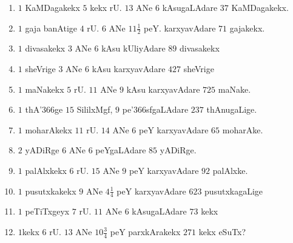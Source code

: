 \begin{enumerate}[\rm(1)]
\item $1$ KaMDagakekx $5$ kekx rU. $13$ ANe $6$ kAsugaLAdare $37$ KaMDagakekx.

\item $1$ gaja banAtige $4$ rU. $6$ ANe $11\frac{1}{2}$ peY. karxyavAdare $71$ gajakekx.

\item $1$ divasakekx $3$ ANe $6$ kAsu kUliyAdare $89$ divasakekx

\item $1$ sheVrige $3$ ANe $6$ kAsu karxyavAdare $427$ sheVrige
\item $1$ maNakekx $5$ rU. $11$ ANe $9$ kAsu karxyavAdare $725$ maNake.

\item $1$ thA\char'366ge $15$ SililxMgf, $9$ pe\char'366sfgaLAdare $237$ thAnugaLige.

\item $1$ moharAkekx $11$ rU. $14$ ANe $6$ peY karxyavAdare $65$ moharAke.

\item $2$ yADiRge $6$ ANe $6$ peYgaLAdare $85$ yADiRge.

\item $1$ palAlxkekx $6$ rU. $15$ ANe $9$ peY karxyavAdare $92$ palAlxke.

\item $1$ pusutxkakekx $9$ ANe $4\frac{1}{4}$ peY karxyavAdare $623$ pusutxkagaLige

\item $1$ peTiTxgeyx $7$ rU. $11$ ANe $6$ kAsugaLAdare $73$ kekx

\item $1$kekx $6$ rU. $13$ ANe $10\frac{3}{4}$ peY parxkArakekx $271$ kekx eSuTx?
\end{enumerate}
